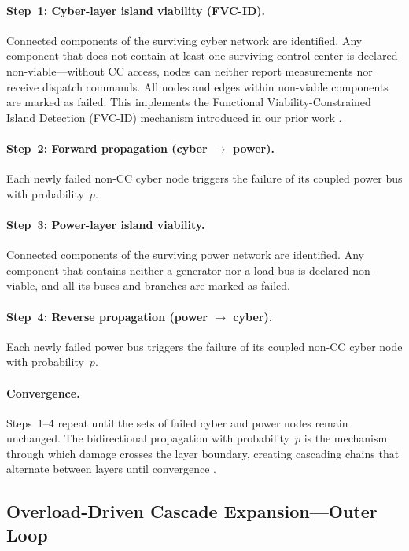 \documentclass[a4paper,fleqn]{cas-dc}
\begin{document}
\paragraph{Step~1: Cyber-layer island viability (FVC-ID).}
Connected components of the surviving cyber network are identified.  Any
component that does not contain at least one surviving control center is
declared non-viable---without CC access, nodes can neither report
measurements nor receive dispatch commands.  All nodes and edges within
non-viable components are marked as failed.  This implements the
Functional Viability-Constrained Island Detection (FVC-ID) mechanism
introduced in our prior work \citep{ChenTu2026}.

\paragraph{Step~2: Forward propagation (cyber $\to$ power).}
Each newly failed non-CC cyber node triggers the failure of its coupled
power bus with probability~$p$.

\paragraph{Step~3: Power-layer island viability.}
Connected components of the surviving power network are identified.  Any
component that contains neither a generator nor a load bus is declared
non-viable, and all its buses and branches are marked as failed.

\paragraph{Step~4: Reverse propagation (power $\to$ cyber).}
Each newly failed power bus triggers the failure of its coupled non-CC
cyber node with probability~$p$.

\paragraph{Convergence.}
Steps~1--4 repeat until the sets of failed cyber and power nodes remain
unchanged.  The bidirectional propagation with probability~$p$ is the
mechanism through which damage crosses the layer boundary, creating
cascading chains that alternate between layers until convergence
\citep{Parshani2010,Shao2011}.

\subsection{Overload-Driven Cascade Expansion---Outer Loop}\label{sec:outer}
\end{document}
